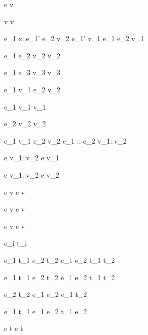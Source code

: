 
  {e  \eval v}


  {}
  {v  \eval v}

  {e_1 \eval \lambda x:\tau.e_1' \Quad
   e_2 \eval v_2 \Quad
   [x \mapsto v_2]e_1' \eval v_1}
  {e_1 e_2 \eval v_1}


  {e_1 \eval \True \Quad
   e_2 \eval v_2}
  { \eval v_2}

  {e_1 \eval \False \Quad
   e_3 \eval v_3}
  { \eval v_3}


  {e_1 \eval v_1 \Quad
   e_2 \eval v_2}
  { \eval {}}

  {e_1 \eval v_1}
  {\Fst {} \eval v_1}

  {e_2 \eval v_2}
  {\Snd {} \eval v_2 }


  {e_1 \eval v_1 \Quad
   e_2 \eval v_2}
  {e_1 :: e_2 \eval v_1::v_2}

  {e \eval v_1::v_2}
  {\Head e \eval v_1}

{e \eval v_1::v_2}
{\Tail e \eval v_2}



  {e \eval v}
  {\Done e \eval \Done v}

  {}
  {\Enter \beta \eval \Enter \beta}

  {e \eval v}
  {\Update e \eval \Update v}

  {e \eval v}
  {\View e \eval \View v}

  { \Quad
   e_i \eval t_i}
  {\Pick{} \eval \Pick{}}


  {e_1 \eval t_1 \Quad
   e_2 \eval t_2}
  {e_1 \Pair e_2 \eval t_1 \Pair t_2}

  {e_1 \eval t_1 \Quad
   e_2 \eval t_2}
  {e_1 \Choose e_2 \eval t_1 \Choose t_2}


  {e_2 \eval t_2}
  {e_1 \Trans e_2 \eval e_1 \Trans t_2}

  {e_1 \eval t_1}
  {e_1 \Step e_2 \eval t_1 \Step e_2}

  {e \eval t}
  {\Forever e \eval \Forever t}


